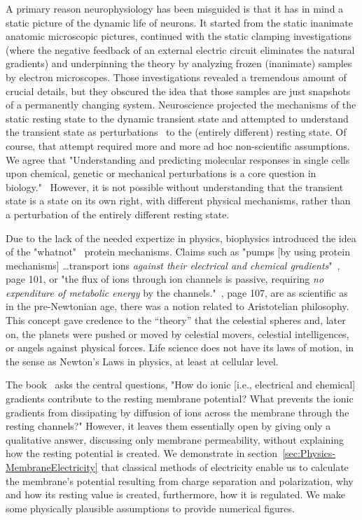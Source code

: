 A primary reason neurophysiology has been misguided is that it has in mind a static picture of the dynamic life of neurons.
It started from the static
inanimate anatomic microscopic pictures, continued
with the static clamping investigations (where
the negative feedback of an external electric circuit eliminates the natural gradients) and underpinning the
theory by analyzing frozen (inanimate) samples
by electron microscopes.
Those investigations revealed a tremendous amount of crucial details,
but they obscured the idea
that those samples are just snapshots of a permanently
changing system.
Neuroscience projected the mechanisms of the static resting state to the dynamic transient state and attempted
to understand the transient state 
as perturbations~\cite{PerturbationNeuralComputation:2002} to the  (entirely different) resting state.
Of course, that attempt required more and more ad hoc non-scientific assumptions.
We agree that "Understanding and predicting molecular responses
in single cells upon chemical, genetic or mechanical perturbations is a core question in biology."~\cite{PerturbationSingleCell:2023}
However, it is not possible without understanding that the transient state is a state on its own right,
with different physical mechanisms, rather than a perturbation of the entirely different resting state.

Due to the lack of the needed expertize in physics,
biophysics introduced the idea of the "whatnot"~\cite{Schrodinger:1992} protein mechanisms.
Claims such as "pumps [by using protein mechanisms] \dots transport ions \textit{against their
electrical and chemical gradients}"~\cite{PrinciplesNeuralScience:2013}, page 101, 
or "the flux of ions through ion channels is passive,
requiring \textit{no expenditure of metabolic energy} by the
channels."~\cite{PrinciplesNeuralScience:2013}, page 107, are as scientific as in the pre-Newtonian age,
there was a notion related to Aristotelian philosophy. This concept gave credence to the “theory” that the celestial spheres and, later on, the planets were pushed or moved by celestial movers, celestial intelligences, or angels against physical forces. Life science does not have its laws of motion, in the sense as Newton's Laws in physics, at least at cellular level. 

The book~\cite{PrinciplesNeuralScience:2013} asks the central questions, "How do ionic [i.e., electrical and chemical] gradients contribute to the resting membrane potential? What prevents
the ionic gradients from dissipating by diffusion of
ions across the membrane through the resting channels?"
However, it leaves them essentially open by giving only a qualitative answer, discussing only membrane permeability, without explaining how the resting potential is created.
%
We demonstrate in section~\ref{sec:Physics-MembraneElectricity} that classical methods of electricity enable us to calculate the membrane's potential resulting from charge separation and polarization, why and how its resting value is created, furthermore, how it is regulated.
We make some physically plausible assumptions to provide numerical figures.

